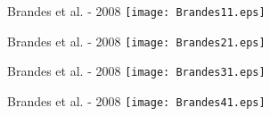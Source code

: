 \documentclass{beamer}
\begin{document}
	\begin{frame}{Brandes et al. - 2008}
		\centering
		\texttt{[image: Brandes11.eps]}
	\end{frame}

	\begin{frame}{Brandes et al. - 2008}
		\centering
		\texttt{[image: Brandes21.eps]}
	\end{frame}

	\begin{frame}{Brandes et al. - 2008}
		\centering
		\texttt{[image: Brandes31.eps]}
	\end{frame}

	\begin{frame}{Brandes et al. - 2008}
		\centering
		\texttt{[image: Brandes41.eps]}
	\end{frame}
\end{document}
